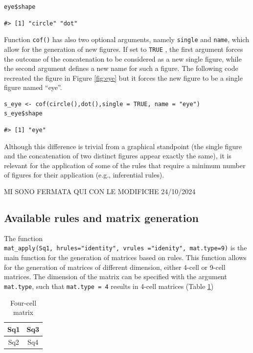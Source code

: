 \begin{verbatim}
eye$shape
\end{verbatim}

\begin{verbatim}
#> [1] "circle" "dot"
\end{verbatim}

Function \texttt{cof()} has also two optional arguments, namely \texttt{single} and \texttt{name}, which allow for the generation of new figures.
If set to \texttt{TRUE} , the first argument forces the outcome of the concatenation to be considered as a new single figure, while the second argument defines a new name for such a figure.
The following code recreated the figure in Figure \ref{fig:eye} but it forces the new figure to be a single figure named ``eye''.

\begin{verbatim}
s_eye <- cof(circle(),dot(),single = TRUE, name = "eye")
s_eye$shape
\end{verbatim}

\begin{verbatim}
#> [1] "eye"
\end{verbatim}

Although this difference is trivial from a graphical standpoint (the single figure and the concatenation of two distinct figures appear exactly the same), it is relevant for the application of some of the rules that require a minimum number of figures for their application (e.g., inferential rules).

MI SONO FERMATA QUI CON LE MODIFICHE 24/10/2024

\subsection{Available rules and matrix generation}\label{available-rules-and-matrix-generation}

The function \texttt{mat\_apply(Sq1,\ hrules="identity",\ vrules\ ="idenity",\ mat.type=9)} is the main function for the generation of matrices based on rules.
This function allows for the generation of matrices of different dimension, either 4-cell or 9-cell matrices.
The dimension of the matrix can be specified with the argument \texttt{mat.type}, such that \texttt{mat.type\ =\ 4} results in 4-cell matrices (Table \ref{tab:fourCell-static})

\begin{table}

\caption{\label{tab:fourCell-static}Four-cell matrix}
\centering
\begin{tabular}[t]{c|c}
\hline
Sq1 & Sq3\\
\hline
Sq2 & Sq4\\
\hline
\end{tabular}
\end{table}

